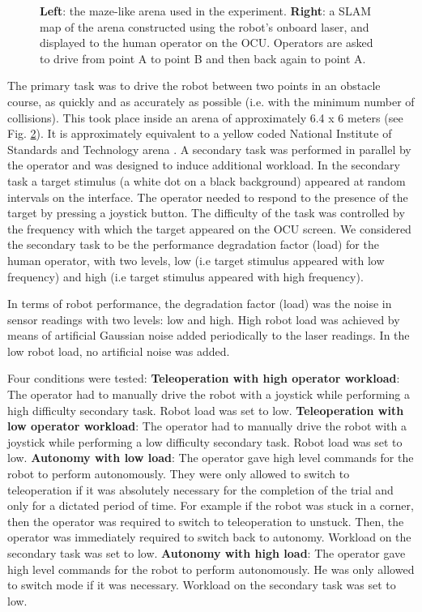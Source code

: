\documentclass[a4paper,12pt,oneside,openright]{bhamthesis}
\begin{document}
\begin{figure}
\begin{subfigure}[b]{0.45\textwidth}
		\label{subfig:map_pilot}
	\end{subfigure}
	\caption{\textbf{Left}: the maze-like arena used in the experiment. \textbf{Right}: a SLAM map of the arena constructed using the robot's onboard laser, and displayed to the human operator on the OCU. Operators are asked to drive from point A to point B and then back again to point A.}
	\label{fig:arena_pilot}
\end{figure}

The primary task was to drive the robot between two points in an obstacle course, as quickly and as accurately as possible (i.e. with the minimum number of collisions). This took place inside an arena of approximately 6.4 x 6 meters (see Fig. \ref{fig:arena_pilot}). It is approximately equivalent to a yellow coded National Institute of Standards and Technology arena \citep{Jacoff2003a}. A secondary task was performed in parallel by the operator and was designed to induce additional workload. In the secondary task a target stimulus (a white dot on a black background) appeared at random intervals on the interface. The operator needed to respond to the presence of the target by pressing a joystick button. The difficulty of the task was controlled by the frequency with which the target appeared on the OCU screen. We considered the secondary task to be the performance degradation factor (load) for the human operator, with two levels, low (i.e target stimulus appeared with low frequency) and high (i.e target stimulus appeared with high frequency).

In terms of robot performance, the degradation factor (load) was the noise in sensor readings with two levels: low and high. High robot load was achieved by means of artificial Gaussian noise added periodically to the laser readings. In the low robot load, no artificial noise was added.

Four conditions were tested: \textbf{Teleoperation with high operator workload}: The operator had to manually drive the robot with a joystick while performing a high difficulty secondary task. Robot load was set to low. \textbf{Teleoperation with low operator workload}: The operator had to manually drive the robot with a joystick while performing a low difficulty secondary task. Robot load was set to low. \textbf{Autonomy with low load}: The operator gave high level commands for the robot to perform autonomously. They were only allowed to switch to teleoperation if it was absolutely necessary for the completion of the trial and only for a dictated period of time. For example if the robot was stuck in a corner, then the operator was required to switch to teleoperation to unstuck. Then, the operator was immediately required to switch back to autonomy. Workload on the secondary task was set to low. \textbf{Autonomy with high load}: The operator gave high level commands for the robot to perform autonomously. He was only allowed to switch mode if it was necessary. Workload on the secondary task was set to low.
\end{document}
